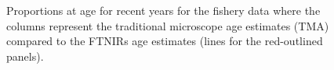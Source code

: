 \documentclass[
  letterpaper,
  DIV=11,
  numbers=noendperiod]{scrreprt}
\begin{document}
\begin{figure}


\caption{\label{fig-proportionsFSH}Proportions at age for recent years
for the fishery data where the columns represent the traditional
microscope age estimates (TMA) compared to the FTNIRs age estimates
(lines for the red-outlined panels).}

\end{figure}%
\end{document}
